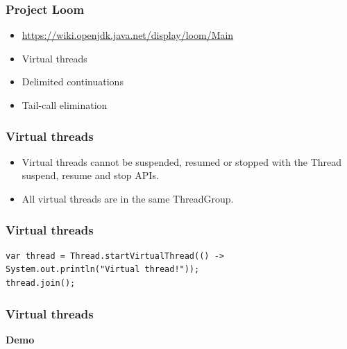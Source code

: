\documentclass[10pt,utf8]{beamer}
\begin{document}
\begin{frame}
  \frametitle{Project Loom}
	\begin{itemize}
		\item \url{https://wiki.openjdk.java.net/display/loom/Main}
		\item Virtual threads
		\item Delimited continuations
		\item Tail-call elimination
	\end{itemize}
\end{frame}

\begin{frame}
  \frametitle{Virtual threads}
	\begin{itemize}
		\item Virtual threads cannot be suspended, resumed or stopped with the Thread suspend, resume and stop APIs.
		\item All virtual threads are in the same ThreadGroup.
	\end{itemize}
\end{frame}

\begin{frame}[fragile]
	\frametitle{Virtual threads}
	\begin{lstlisting}[style=java]
var thread = Thread.startVirtualThread(() -> System.out.println("Virtual thread!"));
thread.join();
	\end{lstlisting}
\end{frame}


\begin{frame}
  \frametitle{Virtual threads}
	\centering
	\huge{\textbf{Demo}}
\end{frame}

\begin{frame}
\end{frame}
\end{document}
